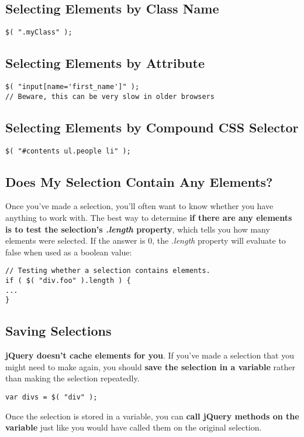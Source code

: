 \documentclass[10pt,letterpaper]{book}
\begin{document}
\subsection{Selecting Elements by Class Name}
\begin{lstlisting}
$( ".myClass" );
\end{lstlisting}
\subsection{Selecting Elements by Attribute}
\begin{lstlisting}
$( "input[name='first_name']" );
// Beware, this can be very slow in older browsers
\end{lstlisting}
\subsection{Selecting Elements by Compound CSS Selector}
\begin{lstlisting}
$( "#contents ul.people li" );
\end{lstlisting}
\subsection{Does My Selection Contain Any Elements?}
Once you've made a selection, you'll often want to know whether you have anything to work with.
The best way to determine \textbf{if there are any elements is to test the selection's \textit{.length} property}, which tells you how many elements were selected. If the answer is 0, the \textit{.length} property will evaluate to false when used as a boolean value:
\begin{lstlisting}
// Testing whether a selection contains elements.
if ( $( "div.foo" ).length ) {
...
}
\end{lstlisting}
\subsection{Saving Selections}
\textbf{jQuery doesn't cache elements for you}. If you've made a selection that you might need to make again, you should \textbf{save the selection in a variable} rather than making the selection repeatedly.
\begin{lstlisting}
var divs = $( "div" );
\end{lstlisting}
Once the selection is stored in a variable, you can \textbf{call jQuery methods on the variable} just like you would have called them on the original selection.
\end{document}
